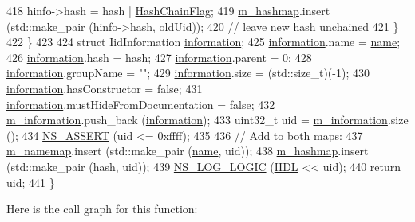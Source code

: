 \begin{DoxyCode}
418         hinfo->hash = hash | \hyperlink{classns3_1_1IidManager_a111b3e20b0fa2fb672257fa63aca771eada8547fce936ccfe8094f1f1f367e53f}{HashChainFlag};
419         \hyperlink{classns3_1_1IidManager_ac86e0322a1b399335032df212d9675ab}{m\_hashmap}.insert (std::make\_pair (hinfo->hash, oldUid));
420         \textcolor{comment}{// leave new hash unchained}
421       \}
422   \}
423 
424  \textcolor{keyword}{struct }IidInformation \hyperlink{doc_2readme_8txt_a56b8f954d58753a81bcf37ef0ad7ca0a}{information};
425   \hyperlink{doc_2readme_8txt_a56b8f954d58753a81bcf37ef0ad7ca0a}{information}.name = \hyperlink{generate__test__data__lte__spectrum__model_8m_ab74e6bf80237ddc4109968cedc58c151}{name};
426   \hyperlink{doc_2readme_8txt_a56b8f954d58753a81bcf37ef0ad7ca0a}{information}.hash = hash;
427   \hyperlink{doc_2readme_8txt_a56b8f954d58753a81bcf37ef0ad7ca0a}{information}.parent = 0;
428   \hyperlink{doc_2readme_8txt_a56b8f954d58753a81bcf37ef0ad7ca0a}{information}.groupName = \textcolor{stringliteral}{""};
429   \hyperlink{doc_2readme_8txt_a56b8f954d58753a81bcf37ef0ad7ca0a}{information}.size = (std::size\_t)(-1);
430   \hyperlink{doc_2readme_8txt_a56b8f954d58753a81bcf37ef0ad7ca0a}{information}.hasConstructor = \textcolor{keyword}{false};
431   \hyperlink{doc_2readme_8txt_a56b8f954d58753a81bcf37ef0ad7ca0a}{information}.mustHideFromDocumentation = \textcolor{keyword}{false};
432   \hyperlink{classns3_1_1IidManager_a70a768fafd827135a13cd6e613e9c78e}{m\_information}.push\_back (\hyperlink{doc_2readme_8txt_a56b8f954d58753a81bcf37ef0ad7ca0a}{information});
433   uint32\_t uid = \hyperlink{classns3_1_1IidManager_a70a768fafd827135a13cd6e613e9c78e}{m\_information}.size ();
434   \hyperlink{assert_8h_a6dccdb0de9b252f60088ce281c49d052}{NS\_ASSERT} (uid <= 0xffff);
435 
436   \textcolor{comment}{// Add to both maps:}
437   \hyperlink{classns3_1_1IidManager_aff98d5f56a6128126bd28261363472ca}{m\_namemap}.insert (std::make\_pair (\hyperlink{generate__test__data__lte__spectrum__model_8m_ab74e6bf80237ddc4109968cedc58c151}{name}, uid));
438   \hyperlink{classns3_1_1IidManager_ac86e0322a1b399335032df212d9675ab}{m\_hashmap}.insert (std::make\_pair (hash, uid));
439   \hyperlink{group__logging_ga88acd260151caf2db9c0fc84997f45ce}{NS\_LOG\_LOGIC} (\hyperlink{type-id_8cc_a3d266412e7a8a083ee1636faffe4ca8c}{IIDL} << uid);
440   \textcolor{keywordflow}{return} uid;
441 \}
\end{DoxyCode}


Here is the call graph for this function\+:





